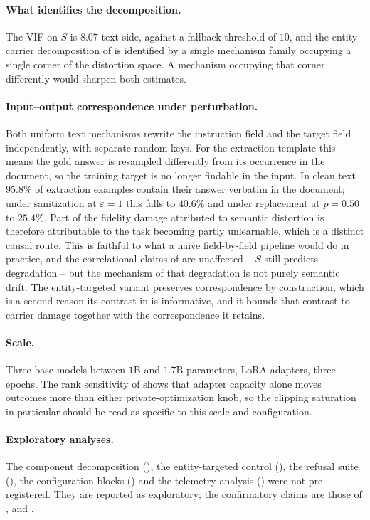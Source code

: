 \paragraph{What identifies the decomposition.}
The VIF on $S$ is $8.07$ text-side,
against a fallback threshold of $10$,
and the entity--carrier decomposition of  is identified by a single mechanism family occupying a single corner of the distortion space.
A mechanism occupying that corner differently would sharpen both estimates.

\paragraph{Input--output correspondence under perturbation.}
Both uniform text mechanisms rewrite the instruction field and the target field independently,
with separate random keys.
For the extraction template this means the gold answer is resampled differently from its occurrence in the document,
so the training target is no longer findable in the input.
In clean text $95.8\%$ of extraction examples contain their answer verbatim in the document;
under sanitization at $\varepsilon = 1$ this falls to $40.6\%$ and under replacement at $p = 0.50$ to $25.4\%$.
Part of the fidelity damage attributed to semantic distortion is therefore attributable to the task becoming partly unlearnable,
which is a distinct causal route.
This is faithful to what a naive field-by-field pipeline would do in practice,
and the correlational claims of  are unaffected -- $S$ still predicts degradation -- but the mechanism of that degradation is not purely semantic drift.
The entity-targeted variant preserves correspondence by construction,
which is a second reason its contrast in  is informative,
and it bounds that contrast to carrier damage together with the correspondence it retains.

\paragraph{Scale.}
Three base models between $1$B and $1.7$B parameters,
LoRA adapters,
three epochs.
The rank sensitivity of  shows that adapter capacity alone moves outcomes more than either private-optimization knob,
so the clipping saturation in particular should be read as specific to this scale and configuration.

\paragraph{Exploratory analyses.}
The component decomposition (),
the entity-targeted control (),
the refusal suite (),
the configuration blocks () and the telemetry analysis () were not pre-registered.
They are reported as exploratory;
the confirmatory claims are those of ,
 and .

